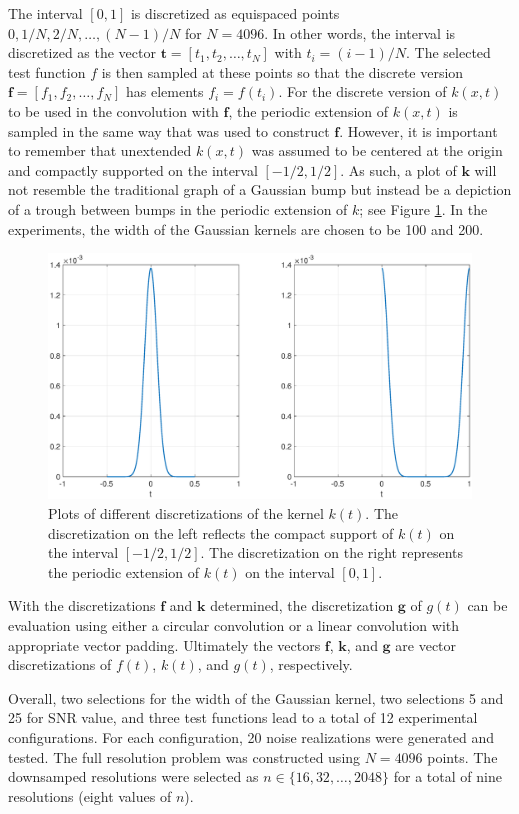 \documentclass[12pt]{article}
\newcommand{\gcon}{g}
\newcommand{\kcon}{k}
\newcommand{\fcon}{f}
\newcommand{\gdis}{\mathbf{g}}
\newcommand{\kdis}{\mathbf{k}}
\newcommand{\fdis}{\mathbf{f}}
\newcommand{\tdis}{\mathbf{t}}
\begin{document}
The interval $[0,1]$ is discretized as equispaced points $0, 1/N, 2/N, \ldots, (N-1)/N$ for $N = 4096$. In other words, the interval is discretized as the vector $\tdis = [t_1,t_2,\ldots,t_N]$ with $t_i = (i-1)/N$. The selected test function $\fcon$ is then sampled at these points so that the discrete version $\fdis = [\fcon_1,\fcon_2,\ldots,\fcon_N]$ has elements $\fcon_i = \fcon(t_i)$. For the discrete version of $\kcon(x,t)$ to be used in the convolution with $\fdis$, the periodic extension of $\kcon(x,t)$ is sampled in the same way that was used to construct $\fdis$. However, it is important to remember that unextended $\kcon(x,t)$ was assumed to be centered at the origin and compactly supported on the interval $[-1/2,1/2]$. As such, a plot of $\kdis$ will not resemble the traditional graph of a Gaussian bump but instead be a depiction of a trough between bumps in the periodic extension of $\kcon$; see Figure \ref{RegAndTroughGaussian}. In the experiments, the width of the Gaussian kernels are chosen to be 100 and 200.  \par

\begin{figure}
	\centerline{\includegraphics[scale = 0.45]{Figures/RegAndTroughGaussian.eps}}
\caption{Plots of different discretizations of the kernel $\kcon(t)$. The discretization on the left reflects the compact support of $\kcon(t)$ on the interval $[-1/2,1/2]$. The discretization on the right represents the periodic extension of $\kcon(t)$ on the interval $[0,1]$.}
\label{RegAndTroughGaussian}
\end{figure}

With the discretizations $\fdis$ and $\kdis$ determined, the discretization $\gdis$ of $\gcon(t)$ can be evaluation using either a circular convolution or a linear convolution with appropriate vector padding. Ultimately the vectors $\fdis$, $\kdis$, and $\gdis$ are vector discretizations of $\fcon(t)$, $\kcon(t)$, and $\gcon(t)$, respectively. \par
Overall, two selections for the width of the Gaussian kernel, two selections 5 and 25 for SNR value, and three test functions lead to a total of 12 experimental configurations. For each configuration, 20 noise realizations were generated and tested. The full resolution problem was constructed using $N = 4096$ points. The downsamped resolutions were selected as $n \in \{16,32,\ldots,2048\}$ for a total of nine resolutions (eight values of $n$).
\end{document}
